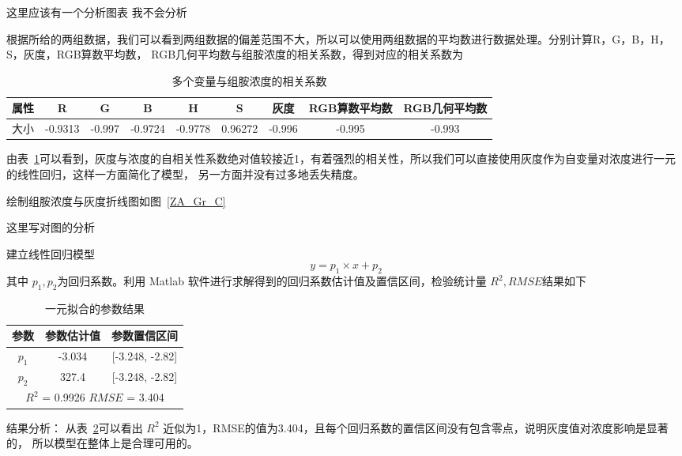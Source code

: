     这里应该有一个分析图表 我不会分析

    根据所给的两组数据，我们可以看到两组数据的偏差范围不大，所以可以使用两组数据的平均数进行数据处理。分别计算R，G，B，H，S，灰度，RGB算数平均数，
    RGB几何平均数与组胺浓度的相关系数，得到对应的相关系数为
    \begin{table}[H]
        \centering
        \caption{多个变量与组胺浓度的相关系数}
        \label{ZuAnCov}
        \begin{tabular}{@{}ccccccccc@{}}
        \toprule
        属性 & R       & G      & B       & H       & S       & 灰度     & RGB算数平均数 & RGB几何平均数 \\ \midrule
        大小 & -0.9313 & -0.997 & -0.9724 & -0.9778 & 0.96272 & -0.996 & -0.995   & -0.993   \\ \bottomrule
        \end{tabular}
        \end{table}
         
    由表~\ref{ZuAnCov}可以看到，灰度与浓度的自相关性系数绝对值较接近1，有着强烈的相关性，所以我们可以直接使用灰度作为自变量对浓度进行一元的线性回归，这样一方面简化了模型，
    另一方面并没有过多地丢失精度。

    绘制组胺浓度与灰度折线图如图~\ref{ZA_Gr_C}


    这里写对图的分析

    建立线性回归模型
    $$ y = p_1 \times x + p_2$$
    其中 $p_{1}, p_{2}$为回归系数。利用 Matlab 软件进行求解得到的回归系数估计值及置信区间，检验统计量 $R^2, RMSE $结果如下

    \begin{table}[H]
        \centering
        \caption{一元拟合的参数结果}
        \label{ZuAnLinear}
        \begin{tabular}{@{}ccc@{}}
        \toprule
        参数         & 参数估计值      & 参数置信区间                  \\ \midrule
        $p_1$      & -3.034     & {[}-3.248, -2.82{]}     \\
        $p_2$      & 327.4      & {[}-3.248, -2.82{]}     \\
        \hline
        \multicolumn{3}{c}{$R^2$ = 0.9926 $RMSE$ = 3.404} \\ \bottomrule
        \end{tabular}
        \end{table}

    结果分析： 从表~\ref{ZuAnLinear}可以看出 $R^2$ 近似为1，RMSE的值为3.404，且每个回归系数的置信区间没有包含零点，说明灰度值对浓度影响是显著的，
    所以模型在整体上是合理可用的。
    
